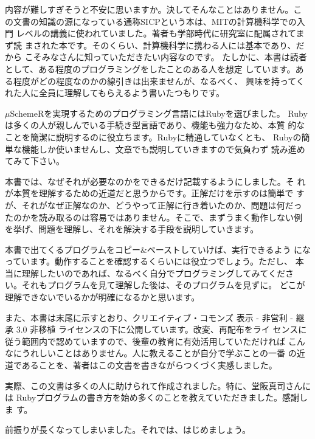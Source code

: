 内容が難しすぎそうと不安に思いますか。決してそんなことはありません。こ
の文書の知識の源になっている通称SICPという本は、MITの計算機科学での入門
レベルの講義に使われていました。著者も学部時代に研究室に配属されてまず読
まされた本です。そのくらい、計算機科学に携わる人には基本であり、だから
こそみなさんに知っていただきたい内容なのです。
たしかに、本書は読者として、ある程度のプログラミングをしたことのある人を想定
しています。ある程度がどの程度なのかの線引きは出来ませんが、なるべく、
興味を持ってくれた人に全員に理解してもらえるよう書いたつもりです。

$\mu$SchemeRを実現するためのプログラミング言語にはRubyを選びました。
Rubyは多くの人が親しんでいる手続き型言語であり、機能も強力なため、本質
的なことを簡潔に説明するのに役立ちます。Rubyに精通していなくとも、
Rubyの簡単な機能しか使いませんし、文章でも説明していきますので気負わず
読み進めてみて下さい。

本書では、なぜそれが必要なのかをできるだけ記載するようにしました。そ
れが本質を理解するための近道だと思うからです。正解だけを示すのは簡単で
すが、それがなぜ正解なのか、どうやって正解に行き着いたのか、問題は何だっ
たのかを読み取るのは容易ではありません。そこで、まずうまく動作しない例
を挙げ、問題を理解し、それを解決する手段を説明していきます。

本書で出てくるプログラムをコピー$\&$ペーストしていけば、実行できるよう
になっています。動作することを確認するくらいには役立つでしょう。ただし、
本当に理解したいのであれば、なるべく自分でプログラミングしてみてくださ
い。それもプログラムを見て理解した後は、そのプログラムを見ずに。
どこが理解できないでいるかが明確になるかと思います。

また、本書は末尾に示すとおり、クリエイティブ・コモンズ 表示 - 非営利
- 継承 3.0 非移植 ライセンスの下に公開しています。改変、再配布をライ
センスに従う範囲内で認めていますので、後輩の教育に有効活用していただければ
こんなにうれしいことはありません。人に教えることが自分で学ぶことの一番
の近道であることを、著者はこの文書を書きながらつくづく実感しました。

実際、この文書は多くの人に助けられて作成されました。特に、堂阪真司さんには
Rubyプログラムの書き方を始め多くのことを教えていただきました。感謝しま
す。

前振りが長くなってしまいました。それでは、はじめましょう。
